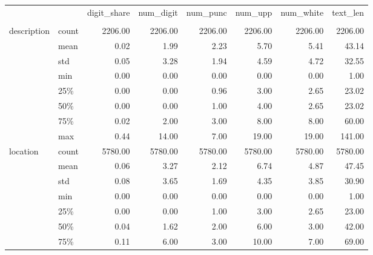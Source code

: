 \begin{table}[h]
\begin{center}

\begin{tabular}{llrrrrrr}
\toprule
            &       &  digit\_share &  num\_digit &   num\_punc &    num\_upp &  num\_white &   text\_len \\
 & {} &              &            &            &            &            &            \\
\midrule
description & count &      2206.00 &    2206.00 &    2206.00 &    2206.00 &    2206.00 &    2206.00 \\
            & mean &         0.02 &       1.99 &       2.23 &       5.70 &       5.41 &      43.14 \\
            & std &         0.05 &       3.28 &       1.94 &       4.59 &       4.72 &      32.55 \\
            & min &         0.00 &       0.00 &       0.00 &       0.00 &       0.00 &       1.00 \\
            & 25\% &         0.00 &       0.00 &       0.96 &       3.00 &       2.65 &      23.02 \\
            & 50\% &         0.00 &       0.00 &       1.00 &       4.00 &       2.65 &      23.02 \\
            & 75\% &         0.02 &       2.00 &       3.00 &       8.00 &       8.00 &      60.00 \\
            & max &         0.44 &      14.00 &       7.00 &      19.00 &      19.00 &     141.00 \\
\midrule
location & count &      5780.00 &    5780.00 &    5780.00 &    5780.00 &    5780.00 &    5780.00 \\
            & mean &         0.06 &       3.27 &       2.12 &       6.74 &       4.87 &      47.45 \\
            & std &         0.08 &       3.65 &       1.69 &       4.35 &       3.85 &      30.90 \\
            & min &         0.00 &       0.00 &       0.00 &       0.00 &       0.00 &       1.00 \\
            & 25\% &         0.00 &       0.00 &       1.00 &       3.00 &       2.65 &      23.00 \\
            & 50\% &         0.04 &       1.62 &       2.00 &       6.00 &       3.00 &      42.00 \\
            & 75\% &         0.11 &       6.00 &       3.00 &      10.00 &       7.00 &      69.00 \\

\end{tabular}
\end{center}
\end{table}
